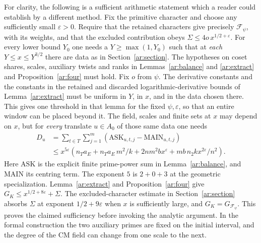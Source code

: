 For clarity, the following is a sufficient arithmetic statement which a reader could establish by a different method. Fix the primitive character and choose any sufficiently small \(\varepsilon>0\). Require that the retained characters give precisely \(\mathcal F_\psi\), with its weights, and that the excluded contribution obeys \(\Sigma\le4o\,x^{1/2+\varepsilon}\). For every lower bound \(Y_0\) one needs a \(Y\ge\max(1,Y_0)\) such that at \emph{each} \(Y\le x\le Y^{3/2}\) there are data as in Section~\ref{ar:section}. The hypotheses on coset shares, scales, auxiliary twists and ranks in Lemmas~\ref{ar:balance} and \ref{ar:extract} and Proposition~\ref{ar:four} must hold. Fix \(o\) from \(\psi\). The derivative constants and the constants in the retained and discarded logarithmic-derivative bounds of Lemma~\ref{ar:extract} must be uniform in \(Y\), in \(x\), and in the data chosen there. This gives one threshold in that lemma for the fixed \(\psi,\varepsilon\), so that an entire window can be placed beyond it. The field, scales and finite sets at \(x\) may depend on \(x\), but for \emph{every} translate \(u\in A_0\) of those same data one needs
\begin{equation}\label{scope:missing}
\begin{split}
 D_u&=\sum_{t\in T}\sum_{j=1}^{m}
       (\mathrm{ASK}_{u,t,j}-\mathrm{MAIN}_{u,t,j})\\
 &\le x^{5\varepsilon}
 \left(n_Ta_E+n_Ta_E\,m^2/k+2n m^2 b x^\varepsilon+
               mb\,n_2 k x^{2\varepsilon}/n^2\right).
\end{split}
\end{equation}
Here \(\mathrm{ASK}\) is the explicit finite prime-power sum in Lemma~\ref{ar:balance}, and \(\mathrm{MAIN}\) its centring term. The exponent \(5\) is \(2+0+3\) at the geometric specialization. Lemma~\ref{ar:extract} and Proposition~\ref{ar:four} give \(G_K\le x^{1/2+8\varepsilon}+\Sigma\). The excluded-character estimate in Section~\ref{ar:section} absorbs \(\Sigma\) at exponent \(1/2+9\varepsilon\) when \(x\) is sufficiently large, and \(G_K=G_{\mathcal F_\psi}\). This proves the claimed sufficiency before invoking the analytic argument. In the formal construction the two auxiliary primes are fixed on the initial interval, and the degree of the CM field can change from one scale to the next.


